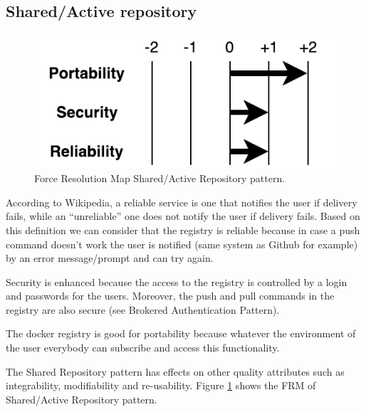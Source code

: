 \subsection{Shared/Active repository} 

\begin{figure}[H]
\centering
\includegraphics[scale=0.7]{6-evaluation/images/shared_active_repo_frm.pdf}
\caption{Force Resolution Map Shared/Active Repository pattern.}
\label{fig:shared-active-repo-frm}
\end{figure}

According to Wikipedia, a reliable service is one that notifies the user if
delivery fails, while an ``unreliable'' one does not notify the user if delivery
fails. Based on this definition we can consider that the registry is reliable
because in case a push command doesn't work the user is notified (same system as
Github for example) by an error message/prompt and can try again.

Security is enhanced because the access to the registry is controlled by a login
and passwords for the users. Moreover, the push and pull commands in the
registry are also secure (see Brokered Authentication Pattern).

The docker registry is good for portability because whatever the environment of
the user everybody can subscribe and access this functionality.

The Shared Repository pattern has effects on other quality attributes such as
integrability, modifiability and re-usability. Figure \ref{fig:shared-active-repo-frm}
shows the FRM of Shared/Active Repository pattern.
